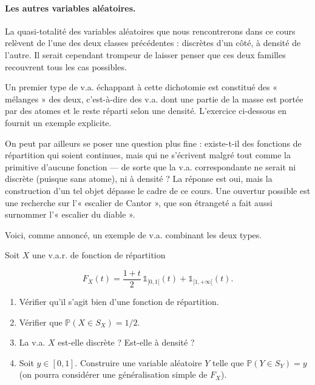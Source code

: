 \paragraph{Les autres variables aléatoires.}

La quasi-totalité des variables aléatoires que nous rencontrerons dans ce cours relèvent de l'une des deux classes précédentes : discrètes d'un côté, à densité de l'autre. Il serait cependant trompeur de laisser penser que ces deux familles recouvrent tous les cas possibles. 

Un premier type de v.a. échappant à cette dichotomie est constitué des « mélanges » des deux, c'est-à-dire des v.a. dont une partie de la masse est portée par des atomes et le reste réparti selon une densité. L'exercice ci-dessous en fournit un exemple explicite.

On peut par ailleurs se poser une question plus fine : existe-t-il des fonctions de répartition qui soient continues, mais qui ne s'écrivent malgré tout comme la primitive d'aucune fonction — de sorte que la v.a. correspondante ne serait ni discrète (puisque sans atome), ni à densité ? La réponse est oui, mais la construction d'un tel objet dépasse le cadre de ce cours. Une ouvertur possible est une recherche sur l'« escalier de Cantor », que son étrangeté a fait aussi surnommer l'« escalier du diable ».

Voici, comme annoncé, un exemple de v.a. combinant les deux types.

\begin{exercice}
Soit $X$ une v.a.r. de fonction de répartition

$$
F_X(t) = \frac{1 + t}{2}\, \mathbb{1}_{[0, 1[}(t) + \mathbb{1}_{[1, +\infty[}(t).
$$

\begin{enumerate}
\item Vérifier qu'il s'agit bien d'une fonction de répartition.
\item Vérifier que $\mathbb{P}(X \in S_X) = 1/2$.
\item La v.a. $X$ est-elle discrète ? Est-elle à densité ?
\item Soit $y \in [0, 1]$. Construire une variable aléatoire $Y$ telle que $\mathbb{P}(Y \in S_Y) = y$ (on pourra considérer une généralisation simple de $F_X$).
\end{enumerate}
\end{exercice}

\newpage

\newpage

